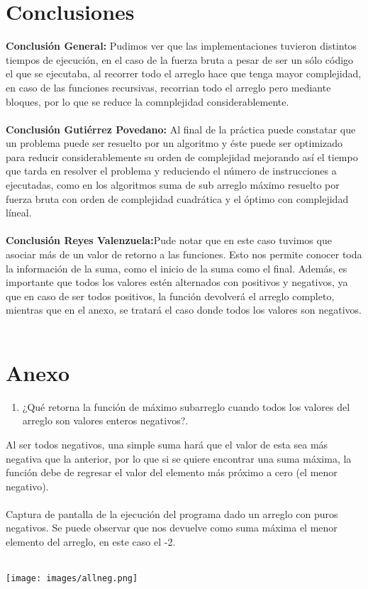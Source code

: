 \documentclass[12pt,twoside]{article}
\begin{document}
\section{Conclusiones}
\textbf{Conclusi\'on General: }Pudimos ver que las implementaciones tuvieron distintos tiempos de ejecuci\'on, en el caso de la fuerza bruta a pesar de ser un s\'olo c\'odigo el que se ejecutaba, al recorrer todo el arreglo hace que tenga mayor complejidad, en caso de las funciones recursivas, recorrian todo el arreglo pero mediante bloques, por lo que se reduce la comnplejidad considerablemente.\\\\
\textbf{Conclusi\'on Guti\'errez Povedano: }Al final de la pr\'actica puede constatar que un problema puede ser resuelto por un algoritmo y \'este puede ser optimizado para reducir considerablemente su orden de complejidad mejorando as\'i el tiempo que tarda en resolver el problema y reduciendo el n\'umero de instrucciones a ejecutadas, como en los algoritmos suma de sub arreglo m\'aximo resuelto por fuerza bruta con orden de complejidad cuadrática y el óptimo con complejidad líneal.\\\\
\textbf{Conclusi\'on Reyes Valenzuela:}Pude notar que en este caso tuvimos que asociar m\'as de un valor de retorno a las funciones. Esto nos permite conocer toda la informaci\'on de la suma, como el inicio de la suma como el final. Adem\'as, es importante que todos los valores est\'en alternados con positivos y negativos, ya que en caso de ser todos positivos, la funci\'on devolver\'a el arreglo completo, mientras que en el anexo, se tratar\'a el caso donde todos los valores son negativos.\\\\
\newpage
\section{Anexo}
\begin{enumerate}
  \item ¿Qu\'e retorna la funci\'on de m\'aximo subarreglo cuando todos los valores del arreglo son valores enteros negativos?.
\end{enumerate}
Al ser todos negativos, una simple suma har\'a que el valor de esta sea m\'as negativa que la anterior, por lo que si se quiere encontrar una suma m\'axima, la funci\'on debe de regresar el valor del elemento m\'as pr\'oximo a cero (el menor negativo).\\\\
Captura de pantalla de la ejecuci\'on del programa dado un arreglo con puros negativos. Se puede observar que nos devuelve como suma m\'axima el menor elemento del arreglo, en este caso el -2.\\\\
\centerline{\texttt{[image: images/allneg.png]}}\\
\end{document}
